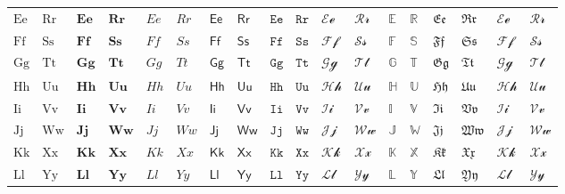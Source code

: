 \begin{table*}[htp]
\begin{threeparttable}
\begin{tabular}{*{18}{l}}
            $\mathrm{Ee}$ & $\mathrm{Rr}$ & $\mathbf{Ee}$ & $\mathbf{Rr}$ & $\mathit{Ee}$ & $\mathit{Rr}$ & $\mathsf{Ee}$ & $\mathsf{Rr}$ & $\mathtt{Ee}$ & $\mathtt{Rr}$ & $\mathcal{Ee}$ & $\mathcal{Rr}$ & $\mathbb{E}$ & $\mathbb{R}$ & $\mathfrak{Ee}$ & $\mathfrak{Rr}$ & $\mathscr{Ee}$ & $\mathscr{Rr}$ \\
            $\mathrm{Ff}$ & $\mathrm{Ss}$ & $\mathbf{Ff}$ & $\mathbf{Ss}$ & $\mathit{Ff}$ & $\mathit{Ss}$ & $\mathsf{Ff}$ & $\mathsf{Ss}$ & $\mathtt{Ff}$ & $\mathtt{Ss}$ & $\mathcal{Ff}$ & $\mathcal{Ss}$ & $\mathbb{F}$ & $\mathbb{S}$ & $\mathfrak{Ff}$ & $\mathfrak{Ss}$ & $\mathscr{Ff}$ & $\mathscr{Ss}$ \\
            $\mathrm{Gg}$ & $\mathrm{Tt}$ & $\mathbf{Gg}$ & $\mathbf{Tt}$ & $\mathit{Gg}$ & $\mathit{Tt}$ & $\mathsf{Gg}$ & $\mathsf{Tt}$ & $\mathtt{Gg}$ & $\mathtt{Tt}$ & $\mathcal{Gg}$ & $\mathcal{Tt}$ & $\mathbb{G}$ & $\mathbb{T}$ & $\mathfrak{Gg}$ & $\mathfrak{Tt}$ & $\mathscr{Gg}$ & $\mathscr{Tt}$ \\
            $\mathrm{Hh}$ & $\mathrm{Uu}$ & $\mathbf{Hh}$ & $\mathbf{Uu}$ & $\mathit{Hh}$ & $\mathit{Uu}$ & $\mathsf{Hh}$ & $\mathsf{Uu}$ & $\mathtt{Hh}$ & $\mathtt{Uu}$ & $\mathcal{Hh}$ & $\mathcal{Uu}$ & $\mathbb{H}$ & $\mathbb{U}$ & $\mathfrak{Hh}$ & $\mathfrak{Uu}$ & $\mathscr{Hh}$ & $\mathscr{Uu}$ \\
            $\mathrm{Ii}$ & $\mathrm{Vv}$ & $\mathbf{Ii}$ & $\mathbf{Vv}$ & $\mathit{Ii}$ & $\mathit{Vv}$ & $\mathsf{Ii}$ & $\mathsf{Vv}$ & $\mathtt{Ii}$ & $\mathtt{Vv}$ & $\mathcal{Ii}$ & $\mathcal{Vv}$ & $\mathbb{I}$ & $\mathbb{V}$ & $\mathfrak{Ii}$ & $\mathfrak{Vv}$ & $\mathscr{Ii}$ & $\mathscr{Vv}$ \\
            $\mathrm{Jj}$ & $\mathrm{Ww}$ & $\mathbf{Jj}$ & $\mathbf{Ww}$ & $\mathit{Jj}$ & $\mathit{Ww}$ & $\mathsf{Jj}$ & $\mathsf{Ww}$ & $\mathtt{Jj}$ & $\mathtt{Ww}$ & $\mathcal{Jj}$ & $\mathcal{Ww}$ & $\mathbb{J}$ & $\mathbb{W}$ & $\mathfrak{Jj}$ & $\mathfrak{Ww}$ & $\mathscr{Jj}$ & $\mathscr{Ww}$ \\
            $\mathrm{Kk}$ & $\mathrm{Xx}$ & $\mathbf{Kk}$ & $\mathbf{Xx}$ & $\mathit{Kk}$ & $\mathit{Xx}$ & $\mathsf{Kk}$ & $\mathsf{Xx}$ & $\mathtt{Kk}$ & $\mathtt{Xx}$ & $\mathcal{Kk}$ & $\mathcal{Xx}$ & $\mathbb{K}$ & $\mathbb{X}$ & $\mathfrak{Kk}$ & $\mathfrak{Xx}$ & $\mathscr{Kk}$ & $\mathscr{Xx}$ \\
            $\mathrm{Ll}$ & $\mathrm{Yy}$ & $\mathbf{Ll}$ & $\mathbf{Yy}$ & $\mathit{Ll}$ & $\mathit{Yy}$ & $\mathsf{Ll}$ & $\mathsf{Yy}$ & $\mathtt{Ll}$ & $\mathtt{Yy}$ & $\mathcal{Ll}$ & $\mathcal{Yy}$ & $\mathbb{L}$ & $\mathbb{Y}$ & $\mathfrak{Ll}$ & $\mathfrak{Yy}$ & $\mathscr{Ll}$ & $\mathscr{Yy}$ \\

\end{tabular}
\end{threeparttable}
\end{table*}
